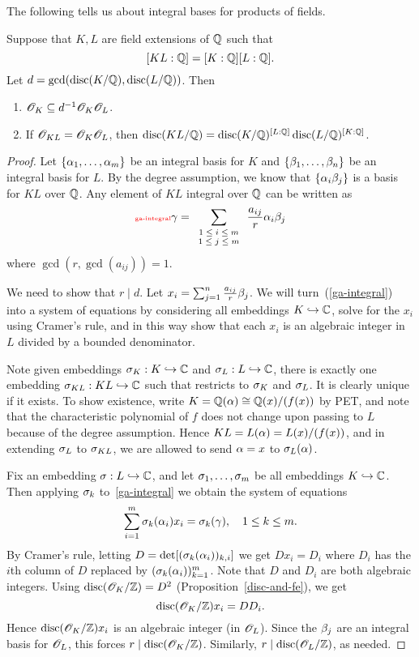 The following tells us about integral bases for products of fields. 
\begin{pr}
Suppose that $K,L$ are field extensions of $\mathbb{Q}$ such that
\[
[KL:\mathbb{Q}]=[K:\mathbb{Q}][L:\mathbb{Q}].
\]
Let $d=\gcd(\operatorname{disc}(K/\mathbb{Q}),\operatorname{disc}(L/\mathbb{Q}))$. 
Then 
\begin{enumerate}
\item $\mathscr{O}_K\subseteq d^{-1}\mathscr{O}_K\mathscr{O}_L$.
\item If $\mathscr{O}_{KL}=\mathscr{O}_K\mathscr{O}_L$, then $\operatorname{disc}(KL/\mathbb{Q})=\operatorname{disc}(K/\mathbb{Q})^{[L:\mathbb{Q}]}\operatorname{disc}(L/\mathbb{Q})^{[K:\mathbb{Q}]}$.
\end{enumerate}
\end{pr}
\begin{proof}
Let $\{\alpha_1,\ldots, \alpha_m\}$ be an integral basis for $K$ and $\{\beta_1,\ldots, \beta_n\}$ be an integral basis for $L$. By the degree assumption, we know that $\{\alpha_i\beta_j\}$ is a basis for $KL$ over $\mathbb{Q}$. Any element of $KL$ integral over $\mathbb{Q}$ can be written as
\begin{equation}\llabel{ga-integral}
\ga=\sumr{1\le i\le m}{1\le j\le m}{} \frac{a_{ij}}{r}\al_i\be_j
\end{equation}
where $\gcd(r,\gcd(a_{ij}))=1$. 

We need to show that $r\mid d$. Let $x_i=\sum_{j=1}^n \frac{a_{ij}}{r}\beta_j$. We will turn~(\ref{ga-integral}) into a system of equations by considering all embeddings $K\hookrightarrow \mathbb{C}$, solve for the $x_i$ using Cramer's rule, and in this way show that each $x_i$ is an algebraic integer in $L$ divided by a bounded denominator.

Note given embeddings $\sigma_K:K\hookrightarrow \mathbb{C}$ and $\sigma_L:L\hookrightarrow \mathbb{C}$, there is exactly one embedding $\sigma_{KL}:KL\hookrightarrow \mathbb{C}$ such that restricts to $\sigma_K$ and $\sigma_L$. It is clearly unique if it exists. To show existence, write $K=\mathbb{Q}(\alpha)\cong\mathbb{Q}(x)/(f(x))$ by PET, and note that the characteristic polynomial of $f$ does not change upon passing to $L$ because of the degree assumption. Hence $KL=L(\alpha)=L(x)/(f(x))$, and in extending $\sigma_L$ to $\sigma_{KL}$, we are allowed to send $\alpha=x$ to $\sigma_L(\alpha)$.

Fix an embedding $\sigma:L\hookrightarrow \mathbb{C}$, and let $\sigma_1,\ldots, \sigma_m$ be all embeddings $K\hookrightarrow \mathbb{C}$. Then applying $\sigma_k$ to~\ref{ga-integral} we obtain the system of equations
\[
\sum_{i=1}^m \sigma_k(\alpha_i) x_i =\sigma_k(\gamma),\quad 1\le k\le m.
\]
By Cramer's rule, letting $D=\det[(\sigma_k(\alpha_i))_{k,i}]$ we get $Dx_i=D_i$ where $D_i$ has the $i$th column of $D$ replaced by $(\sigma_k(\alpha_i))_{k=1}^m$. Note that $D$ and $D_i$ are both algebraic integers.
Using $\operatorname{disc}(\mathscr{O}_K/\mathbb{Z})=D^2$ (Proposition~\ref{disc-and-fe}), we get
\[
\operatorname{disc}(\mathscr{O}_K/\mathbb{Z})x_i=DD_i.
\]
Hence $\operatorname{disc}(\mathscr{O}_K/\mathbb{Z})x_i$ is an algebraic integer (in $\mathscr{O}_L$). Since the $\beta_j$ are an integral basis for $\mathscr{O}_L$, this forces $r\mid \operatorname{disc}(\mathscr{O}_K/\mathbb{Z})$. Similarly, $r\mid \operatorname{disc}(\mathscr{O}_L/\mathbb{Z})$, as needed.


\end{proof}
